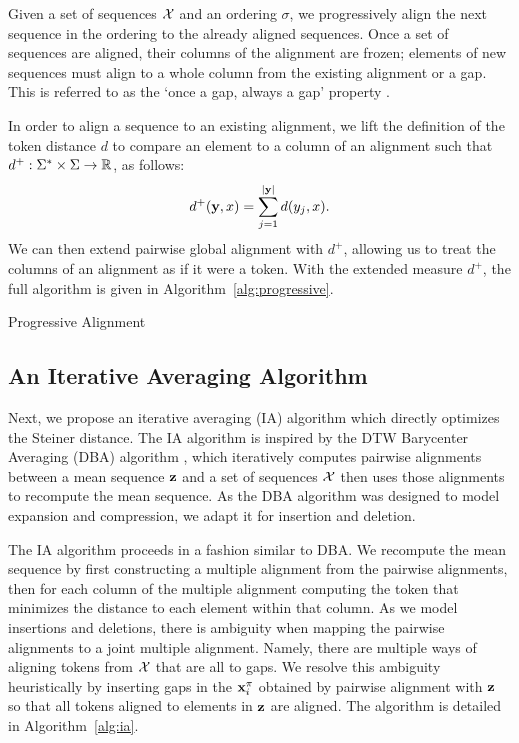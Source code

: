 \documentclass{article}
\begin{document}
Given a set of sequences $\mathcal{X}$ and an ordering $\sigma$,
we progressively align the next sequence in the ordering to the
already aligned sequences.
Once a set of sequences are aligned, their columns of the alignment are frozen;
elements of new sequences must align to a whole column
from the existing alignment or a gap.
This is referred to as the `once a gap, always a gap' property \citep{fengdoolittle}.

In order to align a sequence to an existing alignment, we lift the definition of
the token distance $d$ to compare an element to a column of an alignment 
such that $d^+: \Sigma^*\times\Sigma\to\mathbb{R}$, as follows:
\begin{equation}
\label{eqn:dplus}
d^+(\mathbf{y}, x) = \sum_{j=1}^{|\mathbf{y}|} d(y_j, x).
\end{equation}
We can then extend pairwise global alignment with $d^+$, allowing us to
treat the columns of an alignment as if it were a token.
With the extended measure $d^+$, the full algorithm is given in Algorithm~\ref{alg:progressive}.

\begin{algorithm}[h]
\begin{algorithmic}
\EndFor
{}
\end{algorithmic}
\caption{\label{alg:progressive}
Progressive Alignment
}
\end{algorithm}

\subsection{An Iterative Averaging Algorithm}
Next, we propose an iterative averaging (IA)
algorithm which directly optimizes the Steiner distance.
The IA algorithm is inspired by the
DTW Barycenter Averaging (DBA) algorithm \citep{petitjean2011dba},
which iteratively computes pairwise alignments between a mean sequence $\mathbf{z}$
and a set of sequences $\mathcal{X}$ then uses those alignments to recompute the mean sequence. 
As the DBA algorithm was designed to model expansion and compression, 
we adapt it for insertion and deletion.

The IA algorithm proceeds in a fashion similar to DBA.
We recompute the mean sequence by first constructing a multiple alignment from the
pairwise alignments, then for each column of the multiple alignment
computing the token that minimizes the distance to each element within that column.
As we model insertions and deletions,
there is ambiguity when mapping the pairwise alignments to a joint multiple alignment.
Namely, there are multiple ways of aligning tokens from $\mathcal{X}$ that are all to gaps.
We resolve this ambiguity heuristically by inserting gaps in
the $\mathbf{x}_i^\pi$ obtained by pairwise alignment with $\mathbf{z}$
so that all tokens aligned to elements in $\mathbf{z}$ are aligned.
The algorithm is detailed in Algorithm~\ref{alg:ia}.
\end{document}
